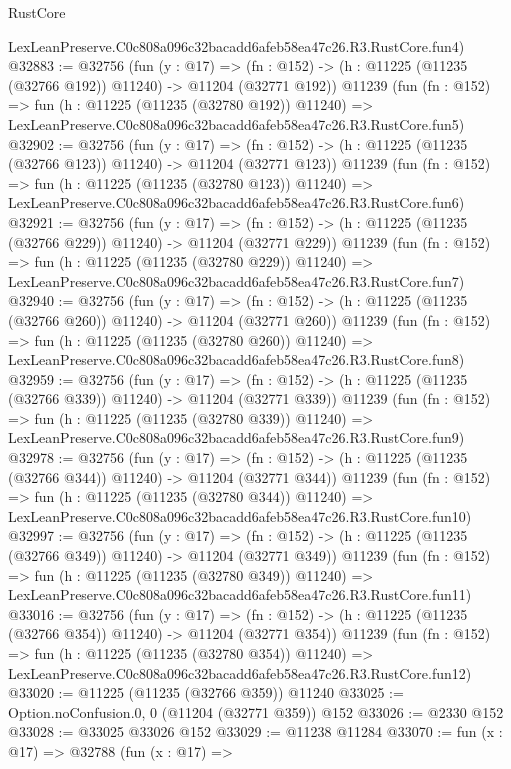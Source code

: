 \begin{lexlean}{RustCore}
\begin{coremodule}
    LexLeanPreserve.C0c808a096c32bacadd6afeb58ea47c26.R3.RustCore.fun4)
@32883 := @32756
    (fun (y : @17) =>
    (fn : @152) -> (h : @11225 (@11235 (@32766 @192)) @11240) -> @11204 (@32771 @192))
    @11239
    (fun (fn : @152) =>
    fun (h : @11225 (@11235 (@32780 @192)) @11240) =>
    LexLeanPreserve.C0c808a096c32bacadd6afeb58ea47c26.R3.RustCore.fun5)
@32902 := @32756
    (fun (y : @17) =>
    (fn : @152) -> (h : @11225 (@11235 (@32766 @123)) @11240) -> @11204 (@32771 @123))
    @11239
    (fun (fn : @152) =>
    fun (h : @11225 (@11235 (@32780 @123)) @11240) =>
    LexLeanPreserve.C0c808a096c32bacadd6afeb58ea47c26.R3.RustCore.fun6)
@32921 := @32756
    (fun (y : @17) =>
    (fn : @152) -> (h : @11225 (@11235 (@32766 @229)) @11240) -> @11204 (@32771 @229))
    @11239
    (fun (fn : @152) =>
    fun (h : @11225 (@11235 (@32780 @229)) @11240) =>
    LexLeanPreserve.C0c808a096c32bacadd6afeb58ea47c26.R3.RustCore.fun7)
@32940 := @32756
    (fun (y : @17) =>
    (fn : @152) -> (h : @11225 (@11235 (@32766 @260)) @11240) -> @11204 (@32771 @260))
    @11239
    (fun (fn : @152) =>
    fun (h : @11225 (@11235 (@32780 @260)) @11240) =>
    LexLeanPreserve.C0c808a096c32bacadd6afeb58ea47c26.R3.RustCore.fun8)
@32959 := @32756
    (fun (y : @17) =>
    (fn : @152) -> (h : @11225 (@11235 (@32766 @339)) @11240) -> @11204 (@32771 @339))
    @11239
    (fun (fn : @152) =>
    fun (h : @11225 (@11235 (@32780 @339)) @11240) =>
    LexLeanPreserve.C0c808a096c32bacadd6afeb58ea47c26.R3.RustCore.fun9)
@32978 := @32756
    (fun (y : @17) =>
    (fn : @152) -> (h : @11225 (@11235 (@32766 @344)) @11240) -> @11204 (@32771 @344))
    @11239
    (fun (fn : @152) =>
    fun (h : @11225 (@11235 (@32780 @344)) @11240) =>
    LexLeanPreserve.C0c808a096c32bacadd6afeb58ea47c26.R3.RustCore.fun10)
@32997 := @32756
    (fun (y : @17) =>
    (fn : @152) -> (h : @11225 (@11235 (@32766 @349)) @11240) -> @11204 (@32771 @349))
    @11239
    (fun (fn : @152) =>
    fun (h : @11225 (@11235 (@32780 @349)) @11240) =>
    LexLeanPreserve.C0c808a096c32bacadd6afeb58ea47c26.R3.RustCore.fun11)
@33016 := @32756
    (fun (y : @17) =>
    (fn : @152) -> (h : @11225 (@11235 (@32766 @354)) @11240) -> @11204 (@32771 @354))
    @11239
    (fun (fn : @152) =>
    fun (h : @11225 (@11235 (@32780 @354)) @11240) =>
    LexLeanPreserve.C0c808a096c32bacadd6afeb58ea47c26.R3.RustCore.fun12)
@33020 := @11225 (@11235 (@32766 @359)) @11240
@33025 := Option.noConfusion.{0, 0} (@11204 (@32771 @359)) @152
@33026 := @2330 @152
@33028 := @33025 @33026 @152
@33029 := @11238 @11284
@33070 := fun (x : @17) =>
  @32788
    (fun (x : @17) =>

\end{coremodule}
\end{lexlean}
